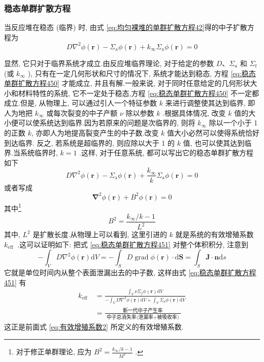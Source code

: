 \documentclass{Sichuan Normal University}
\begin{document}
\subsubsection{稳态单群扩散方程}\label{sec:稳态单群扩散方程}
当反应堆在稳态 (临界) 时, 由式 \eqref{eq:均匀裸堆的单群扩散方程42}得的中子扩散方程为
\begin{equation}
D \nabla^2 \phi(\boldsymbol{r})-\Sigma_{\mathrm{a}} \phi(\boldsymbol{r})+k_{\infty} \Sigma_{\mathrm{a}} \phi(\boldsymbol{r})=0
\label{eq:稳态单群扩散方程450}
\end{equation}

显然, 它只对于临界系统才成立.由反应堆临界理论, 对于给定的参数 $D 、 \Sigma_{a}$ 和 $\Sigma_{\mathrm{f}}$ (或 $k_{\infty}$ ), 只有在一定几何形状和尺寸的情况下, 系统才能达到稳态, 方程 \eqref{eq:稳态单群扩散方程450} 才能成立, 并且有解.一般来说, 对于同时任意给定的几何形状大小和材料特性的系统, 它不一定处于稳态,方程 \eqref{eq:稳态单群扩散方程450} 不一定都成立.但是, 从物理上, 可以通过引人一个特征参数 $k$ 来进行调整使其达到临界, 即人为地把 $k_{\infty}$ 或每次裂变的中子产额 $\nu$ 除以参数 $k$ .根据具体情况, 改变 $k$ 值的大小便可以使系统达到临界.因为若原来的问题是次临界的, 则将 $k_{\infty}$ 除以一个小于 1 的正数 $k$, 亦即人为地提高裂变产生的中子数.改变 $k$ 值大小必然可以使得系统恰好到达临界.
反之, 若系统是超临界的, 则应除以大于 1 的 $k$ 值, 也可以使其达到临界.当系统临界时, $k=1$ .这样, 对于任意系统, 都可以写出它的稳态单群扩散方程如下
\begin{equation}
D \nabla^2 \phi(\boldsymbol{r})-\Sigma_{\mathrm{a}} \phi(\boldsymbol{r})+\frac{k_{\infty}}{k} \Sigma_{\mathrm{a}} \phi(\boldsymbol{r})=0
\label{eq:稳态单群扩散方程451}
\end{equation}
或者写成
\begin{equation}
\boldsymbol{\nabla}^2 \phi(\boldsymbol{r})+B^2 \phi(\boldsymbol{r})=0
\label{eq:均匀裸堆稳态单群扩散方程}
\end{equation}其中\footnote{对于修正单群理论, 应为 $B^2=\frac{k_{\infty} / k-1}{M^2}$ .}
\begin{equation}
B^2=\frac{k_{\infty} / k-1}{L^2}
\end{equation}
其中, $L^2$ 是扩散长度.从物理上可以看到, 这里引进的 $k$ 就是系统的有效增殖系数 $k_{\text {eff }}$ .这可以证明如下: 把式 \eqref{eq:稳态单群扩散方程451} 对整个体积积分, 注意到
\begin{equation}
-\int_V D \nabla^2 \phi(\boldsymbol{r}) \mathrm{d} V=-\int_S D \operatorname{grad} \phi(\boldsymbol{r}) \cdot \mathrm{d} \boldsymbol{S}=\int_S \boldsymbol{J} \cdot \boldsymbol{n} \mathrm{d} s
\end{equation}
它就是单位时间内从整个表面泄漏出去的中子数, 这样由式 \eqref{eq:稳态单群扩散方程451} 有
\begin{equation}
\begin{aligned}
k_{\text {eff }} & =\frac{\int_V \nu \Sigma_f \phi(\boldsymbol{r}) \mathrm{d} V}{-\int_V D \nabla^2 \phi(\boldsymbol{r}) \mathrm{d} V+\int_V \Sigma_{\mathrm{a}} \phi(\boldsymbol{r}) \mathrm{d} V} \\
& =\frac{\text { 新一代中子产生率 }}{\text { 中子总消失率(泄漏率+被吸收率) }}
\end{aligned}
\end{equation}
这正是前面式 \eqref{eq:有效增殖系数2} 所定义的有效增殖系数.
\end{document}
